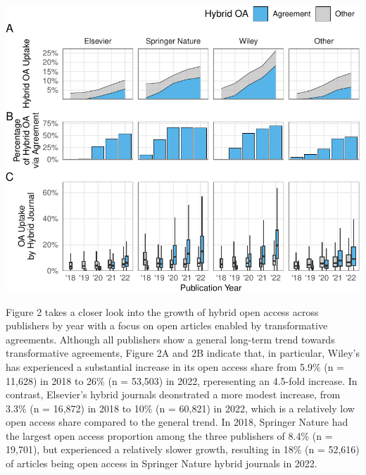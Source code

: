 \documentclass[a4paper,man,floatsintext,longtable,noextraspace,12pt]{apa6}
\begin{document}
\begin{center}\includegraphics[width=0.99\linewidth]{fig/unnamed-chunk-6-1} \end{center}

Figure 2 takes a closer look into the growth of hybrid open access
across publishers by year with a focus on open articles enabled by
transformative agreements. Although all publishers show a general
long-term trend towards transformative agreements, Figure 2A and 2B
indicate that, in particular, Wiley's has experienced a substantial
increase in its open access share from 5.9\% (n = 11,628) in 2018 to
26\% (n = 53,503) in 2022, rperesenting an 4.5-fold increase. In
contrast, Elsevier's hybrid journals deonstrated a more modest increase,
from 3.3\% (n = 16,872) in 2018 to 10\% (n = 60,821) in 2022, which is a
relatively low open access share compared to the general trend. In 2018,
Springer Nature had the largest open access proportion among the three
publishers of 8.4\% (n = 19,701), but experienced a relatively slower
growth, resulting in 18\% (n = 52,616) of articles being open access in
Springer Nature hybrid journals in 2022.
\end{document}

